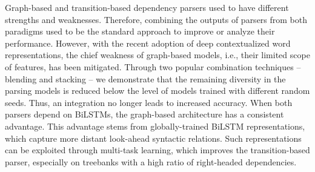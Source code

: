 Graph-based and transition-based dependency parsers used to have different strengths and weaknesses. Therefore, combining the outputs of parsers from both paradigms used to be the standard approach to improve or analyze their performance. However, with the recent adoption of deep contextualized word representations, the chief weakness of graph-based models, i.e., their limited scope of features, has been mitigated. Through two popular combination techniques -- blending and stacking -- we demonstrate that the remaining diversity in the parsing models is reduced below the level of models trained with different random seeds. Thus, an integration no longer leads to increased accuracy. When both parsers depend on BiLSTMs, the graph-based architecture has a consistent advantage. This advantage stems from globally-trained BiLSTM representations, which capture more distant look-ahead syntactic relations. Such representations can be exploited through multi-task learning, which improves the transition-based parser, especially on treebanks with a high ratio of right-headed dependencies.
